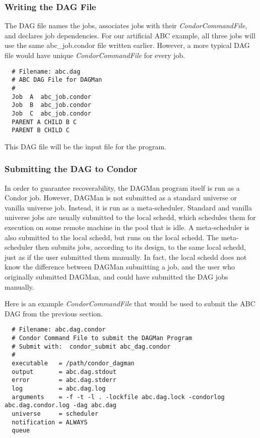 \subsubsection{Writing the DAG File}

The DAG file names the jobs, associates jobs with their
\textit{CondorCommandFile}, and declares job dependencies.  For our artificial
ABC example, all three jobs will use the same abc\_job.condor file written
earlier.  However, a more typical DAG file would have unique
\textit{CondorCommandFile} for every job.

\begin{verbatim}
  # Filename: abc.dag
  # ABC DAG File for DAGMan
  #
  Job  A  abc_job.condor
  Job  B  abc_job.condor
  Job  C  abc_job.condor
  PARENT A CHILD B C
  PARENT B CHILD C
\end{verbatim}

This DAG file will be the input file for the  program.

\subsubsection{Submitting the DAG to Condor}

In order to guarantee recoverability, the DAGMan program itself is run as a
Condor job.  However, DAGMan is not submitted as a standard universe or
vanilla universe job.  Instead, it is run as a meta-scheduler.  Standard and
vanilla universe jobs are usually submitted to the local schedd, which
schedules them for execution on some remote machine in the pool that is idle.
A meta-scheduler is also submitted to the local schedd, but runs on the local
schedd.  The meta-scheduler then submits jobs, according to its design, to the
same local schedd, just as if the user submitted them manually.  In fact, the
local schedd does not know the difference between DAGMan submitting a job, and
the user who originally submitted DAGMan, and could have submitted the DAG
jobs manually.

Here is an example \textit{CondorCommandFile} that would be used to submit the
ABC DAG from the previous section.

\begin{verbatim}
  # Filename: abc.dag.condor
  # Condor Command File to submit the DAGMan Program
  # Submit with:  condor_submit abc_dag.condor
  #
  executable   = /path/condor_dagman
  output       = abc.dag.stdout
  error        = abc.dag.stderr
  log          = abc.dag.log
  arguments    = -f -t -l . -lockfile abc.dag.lock -condorlog abc.dag.condor.log -dag abc.dag
  universe     = scheduler
  notification = ALWAYS
  queue
\end{verbatim}


